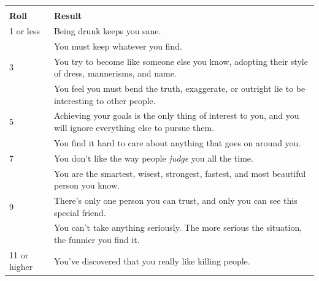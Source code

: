 \documentclass[twoside]{article}
\begin{document}
\begin{center}
\noindent\begin{tabular}{>{\centering\arraybackslash}p{}p{}}
\multicolumn{2}{c}{\textbf{Minor Corruptions}}\\
\textbf{Roll}&\textbf{Result}\\
\rowcolor[gray]{0.75}1 or less&Being drunk keeps you sane.\\
2&You must keep whatever you find.\\
\rowcolor[gray]{0.75}3&You try to become like someone else you know, adopting their style of dress, mannerisms, and name.\\
4&You feel you must bend the truth, exaggerate, or outright lie to be interesting to other people.\\
\rowcolor[gray]{0.75}5&Achieving your goals is the only thing of interest to you, and you will ignore everything else to pursue them.\\
6&You find it hard to care about anything that goes on around you.\\
\rowcolor[gray]{0.75}7&You don't like the way people \emph{judge} you all the time.\\
8&You are the smartest, wisest, strongest, fastest, and most beautiful person you know.\\
\rowcolor[gray]{0.75}9&There's only one person you can trust, and only you can see this special friend.\\
10&You can't take anything seriously. The more serious the situation, the funnier you find it.\\
\rowcolor[gray]{0.75}11 or higher&You've discovered that you really like killing people.\\
\end{tabular}
\end{center}

\bigbreak
\end{document}
